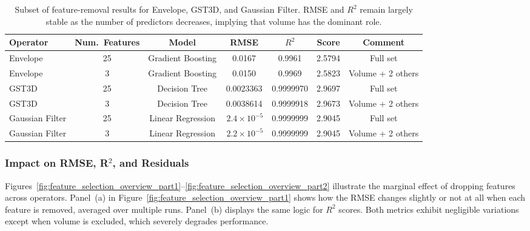 \begin{table}[htbp]
    \centering
    \begin{tabular}{lcccccc}
        \hline
        \textbf{Operator} & \textbf{Num.\ Features} & \textbf{Model}    & \textbf{\ac{RMSE}}       & \textbf{$R^2$} & \textbf{Score} & \textbf{Comment} \\
        \hline
        Envelope          & 25                      & Gradient Boosting & 0.0167                   & 0.9961         & 2.5794         & Full set          \\
        Envelope          & 3                       & Gradient Boosting & 0.0150                   & 0.9969         & 2.5823         & Volume + 2 others \\
        \hline
        \ac{GST3D}        & 25                      & Decision Tree     & 0.0023363                & 0.9999970      & 2.9697         & Full set          \\
        \ac{GST3D}        & 3                       & Decision Tree     & 0.0038614                & 0.9999918      & 2.9673         & Volume + 2 others \\
        \hline
        Gaussian Filter   & 25                      & Linear Regression & \(\,2.4 \times 10^{-5}\) & 0.9999999      & 2.9045         & Full set          \\
        Gaussian Filter   & 3                       & Linear Regression & \(\,2.2 \times 10^{-5}\) & 0.9999999      & 2.9045         & Volume + 2 others \\
        \hline
    \end{tabular}
    \caption{Subset of feature-removal results for Envelope, \ac{GST3D}, and Gaussian Filter.
    \ac{RMSE} and $R^2$ remain largely stable as the number of predictors decreases, implying that volume has the dominant role.
    \label{tab:feature_selection_minimal_impact}
    }
\end{table}

\subsubsection{Impact on RMSE, R\texorpdfstring{$^2$}{2}, and Residuals}
\label{subsec:impact-on-rmse-r2-and-residuals}

Figures~\ref{fig:feature_selection_overview_part1}--\ref{fig:feature_selection_overview_part2} illustrate the marginal effect of dropping features across operators.
Panel~(a) in Figure~\ref{fig:feature_selection_overview_part1} shows how the \ac{RMSE} changes slightly or not at all when each feature is removed, averaged over multiple runs.
Panel~(b) displays the same logic for $R^2$ scores.
Both metrics exhibit negligible variations except when volume is excluded, which severely degrades performance.

